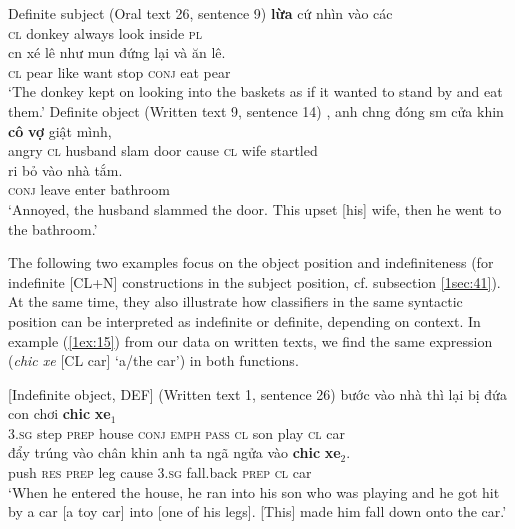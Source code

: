 \documentclass[output=paper]{langsci/langscibook}
\begin{document}
\begin{exe}
\ex\label{1ex:13}
Definite subject (Oral text 26, sentence 9) 
\exi{}
 {\textbf{lừa}}        cứ        nhìn vào    các  \\
{\textsc{cl}}  donkey  always look inside {\textsc{pl}}  \\
\glt
\exi{}
\gll c{\daab}n  {xé lê}   như  mu{\dao}n {đứng lại}  và        ăn   lê.   \\
{\textsc{cl}}  pear   like   want  stop         {\textsc{conj}}  eat  pear \\
\glt `The donkey kept on looking into the baskets as if it wanted to stand by and eat them.'
\ex\label{1ex:14}
Definite object (Written text 9, sentence 14) 
\exi{}
,  anh ch{\daob}ng      {đóng s{\daab}m}   cửa   khi{\dae}n  {\textbf{cô}}  {\textbf{vợ}}      {giật mình}, \\
angry         {\textsc{cl}}  husband   slam          door  cause  {\textsc{cl}} wife  startled \\
\glt 
\exi{}
\gll r{\daob}i        bỏ     vào     {nhà tắm}. \\
{\textsc{conj}}  leave enter   bathroom \\
\glt `Annoyed, the husband slammed the door. This upset [his] wife, then he went to the bathroom.'
\end{exe}

The following two examples focus on the object position and indefiniteness (for indefinite [CL+N] constructions in the subject position, cf. subsection \ref{1sec:41}). At the same time, they also illustrate how classifiers in the same syntactic position can be interpreted as indefinite or definite, depending on context. In example (\ref{1ex:15}) from our data on written texts, we find the same expression ({\emph{chi{\dae}c xe}} [CL car] `a/the car') in both functions. 

\begin{exe}
\ex\label{1ex:15}
[Indefinite object, \pm DEF] (Written text 1, sentence 26)
\exi{}
 bước vào     nhà     thì         lại          bị        đứa  con  chơi  {\textbf{chi{\dae}c}} {\textbf{xe$_1$}}  \\
3.{\textsc{sg}}    step  {\textsc{prep}} house  {\textsc{conj}}   {\textsc{emph}}   {\textsc{pass}}  {\textsc{cl}}   son  play   {\textsc{cl}}  car \\
\glt
\gll đẩy    trúng  vào    chân  khi{\dae}n  {anh ta}  {ngã ngửa}  vào      {\textbf{chi{\dae}c}} {\textbf{xe$_2$}}. \\
push  {\textsc{res}}   {\textsc{prep}} leg    cause  3.{\textsc{sg}}    fall.back    {\textsc{prep}}  {\textsc{cl}} car \\
\glt `When he entered the house, he ran into his son who was playing and he got hit by a car [a toy car] into [one of his legs]. [This] made him fall down onto the car.'
\end{exe}
\end{document}
